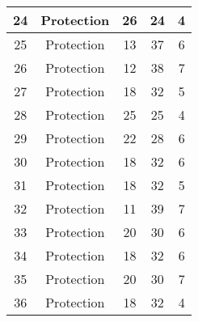 \documentclass[results.tex]{subfiles}
\begin{document}
\begin{center}
\begin{tabular}{| c || c | c | c | c |}
            \hline
            24                      & Protection                   & 26                     & 24                      & 4                    \\
            \hline
            25                      & Protection                   & 13                     & 37                      & 6                    \\
            \hline
            26                      & Protection                   & 12                     & 38                      & 7                    \\
            \hline
            27                      & Protection                   & 18                     & 32                      & 5                    \\
            \hline
            28                      & Protection                   & 25                     & 25                      & 4                    \\
            \hline
            29                      & Protection                   & 22                     & 28                      & 6                    \\
            \hline
            30                      & Protection                   & 18                     & 32                      & 6                    \\
            \hline
            31                      & Protection                   & 18                     & 32                      & 5                    \\
            \hline
            32                      & Protection                   & 11                     & 39                      & 7                    \\
            \hline
            33                      & Protection                   & 20                     & 30                      & 6                    \\
            \hline
            34                      & Protection                   & 18                     & 32                      & 6                    \\
            \hline
            35                      & Protection                   & 20                     & 30                      & 7                    \\
            \hline
            36                      & Protection                   & 18                     & 32                      & 4                    \\

\end{tabular}
\end{center}
\end{document}
